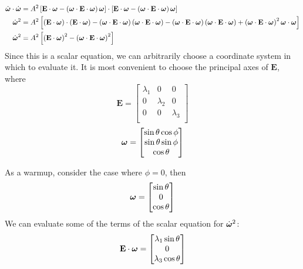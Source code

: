 \documentclass[extra,mreferee]{gji}
\begin{document}
\begin{equation}
\begin{aligned}
\dot{\mitbf{\omega}} \cdot \dot{\mitbf{\omega}} &= 
A^2 \left[ \mathbf{E}\cdot \mitbf{\omega} - \left(\mitbf{\omega} \cdot \mathbf{E} \cdot \mitbf{\omega} \right)\mitbf{\omega}\right]
\cdot \left[ \mathbf{E}\cdot \mitbf{\omega} - \left(\mitbf{\omega} \cdot \mathbf{E} \cdot \mitbf{\omega} \right)\mitbf{\omega}\right] \\
\dot{\mitbf{\omega}}^2  &= 
A^2 \left[ \left(\mathbf{E}\cdot \mitbf{\omega}\right)\cdot \left(\mathbf{E}\cdot \mitbf{\omega}\right)
 - \left(\mitbf{\omega} \cdot \mathbf{E} \cdot \mitbf{\omega} \right) \left( \mitbf{\omega}\cdot \mathbf{E} \cdot \mitbf{\omega} \right) 
 - \left(\mitbf{\omega} \cdot \mathbf{E} \cdot \mitbf{\omega} \right) \left( \mitbf{\omega}\cdot \mathbf{E} \cdot \mitbf{\omega} \right) 
 + \left(\mitbf{\omega} \cdot \mathbf{E} \cdot \mitbf{\omega} \right)^2 \mitbf{\omega}\cdot \mitbf{\omega} 
\right]\\
\dot{\mitbf{\omega}}^2  &= 
A^2 \left[ \left(\mathbf{E}\cdot \mitbf{\omega}\right)^2
 - \left(\mitbf{\omega} \cdot \mathbf{E} \cdot \mitbf{\omega} \right)^2 
\right]\\
\end{aligned}
\end{equation}
Since this is a scalar equation, we can arbitrarily choose a coordinate system in which to evaluate it.
It is most convenient to choose the principal axes of $\mathbf{E}$, where
\begin{equation}
\mathbf{E} = 
\begin{bmatrix}
\lambda_1 & 0 & 0 \\
0 & \lambda_2 & 0 \\
0 & 0 & \lambda_3 \\
\end{bmatrix}
\end{equation}
\begin{equation}
\mitbf{\omega} = 
\begin{bmatrix}
\sin{\theta} \cos{\phi} \\
\sin{\theta} \sin{\phi} \\
\cos{\theta} \\
\end{bmatrix}
\end{equation}

As a warmup, consider the case where $\phi = 0$, then  
\begin{equation}
\mitbf{\omega} = 
\begin{bmatrix}
\sin{\theta}  \\
0 \\
\cos{\theta} \\
\end{bmatrix}
\end{equation}
We can evaluate some of the terms of the scalar equation for $\dot{\mitbf{\omega}}^2$:
\begin{equation}
\mathbf{E}\cdot \mitbf{\omega} = 
\begin{bmatrix}
\lambda_1 \sin{\theta} \\
0 \\
\lambda_3 \cos{\theta}
\end{bmatrix}
\end{equation}
\end{document}
